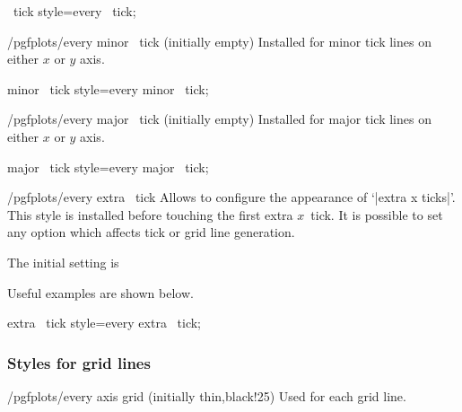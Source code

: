 \pgfplotsshortxystylekey \x\ tick style=every \x\ tick;

\begin{xystylekey}{/pgfplots/every minor \x\ tick (initially empty)}
	Installed for minor tick lines on either $x$ or $y$ axis.
\end{xystylekey}

\pgfplotsshortxystylekey minor \x\ tick style=every minor \x\ tick;

\begin{xystylekey}{/pgfplots/every major \x\ tick (initially empty)}
	Installed for major tick lines on either $x$ or $y$ axis.
\end{xystylekey}
\pgfplotsshortxystylekey major \x\ tick style=every major \x\ tick;

\begin{xystylekey}{/pgfplots/every extra \x\ tick}
 Allows to configure the appearance of `|extra x ticks|'. This style is installed before touching the first extra $x$~tick. It is possible to set any option which affects tick or grid line generation.

The initial setting is
\begin{codeexample}
\end{codeexample}

 Useful examples are shown below.
\begin{codeexample}
\end{codeexample}
\end{xystylekey}

\pgfplotsshortxystylekey extra \x\ tick style=every extra \x\ tick;



\subsubsection*{Styles for grid lines}

\begin{stylekey}{/pgfplots/every axis grid (initially thin,black!25)}
 Used for each grid line.
\end{stylekey}

